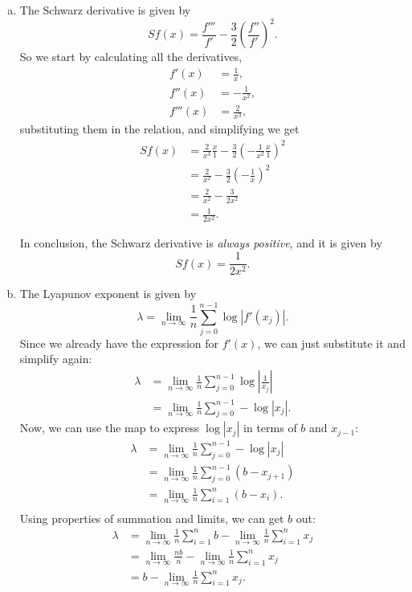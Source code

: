 \begin{enumerate}[(a)]
    \item The Schwarz derivative is given by
    \[
        Sf(x) = \frac{f'''}{f'} - \frac{3}{2}\left(\frac{f''}{f'}\right)^2.
    \]
    So we start by calculating all the derivatives,
    \begin{align*}
        f'(x) &= \frac{1}{x}, \\
        f''(x) &= -\frac{1}{x^2}, \\
        f'''(x) &= \frac{2}{x^3},
    \end{align*}
    substituting them in the relation, and simplifying we get
    \begin{align*}
            Sf(x) &= \frac{2}{x^3}\frac{x}{1} - \frac{3}{2}\left(-\frac{1}{x^2}\frac{x}{1}\right)^2 \\
                  &= \frac{2}{x^2} - \frac{3}{2}\left(-\frac{1}{x}\right)^2 \\
                  &= \frac{2}{x^2} - \frac{3}{2x^2} \\
                  &= \frac{1}{2x^2}.
    \end{align*}

    In conclusion, the Schwarz derivative is \textit{always positive}, and it is given by
    \[
        \boxed{
            Sf(x) = \frac{1}{2x^2}.
        }
    \]

    \item The Lyapunov exponent is given by
    \[
        \lambda = \lim_{n\to\infty}\frac{1}{n}\sum_{j=0}^{n-1}\log|f'(x_j)|.
    \]
    Since we already have the expression for $f'(x)$, we can just substitute it and simplify again:
    \begin{align*}
        \lambda &= \lim_{n\to\infty}\frac{1}{n}\sum_{j=0}^{n-1}\log\left|\frac{1}{x_j}\right| \\
                &= \lim_{n\to\infty}\frac{1}{n}\sum_{j=0}^{n-1}-\log|x_j|.
    \end{align*}
    Now, we can use the map to express $\log|x_j|$ in terms of $b$ and $x_{j-1}$:
    \begin{align*}
        \lambda &= \lim_{n\to\infty}\frac{1}{n}\sum_{j=0}^{n-1}-\log|x_j| \\
                &= \lim_{n\to\infty}\frac{1}{n}\sum_{j=0}^{n-1}(b - x_{j+1}) \\
                &= \lim_{n\to\infty}\frac{1}{n}\sum_{i=1}^{n}(b - x_{i}). \\
    \end{align*}
    Using properties of summation and limits, we can get $b$ out:
    \begin{align*}
        \lambda &= \lim_{n\to\infty}\frac{1}{n}\sum_{i=1}^{n}b - \lim_{n\to\infty}\frac{1}{n}\sum_{i=1}^{n}x_j \\
                &= \lim_{n\to\infty}\frac{nb}{n} - \lim_{n\to\infty}\frac{1}{n}\sum_{i=1}^{n}x_j \\
                &= b - \lim_{n\to\infty}\frac{1}{n}\sum_{i=1}^{n}x_j.
    \end{align*}

\end{enumerate}

